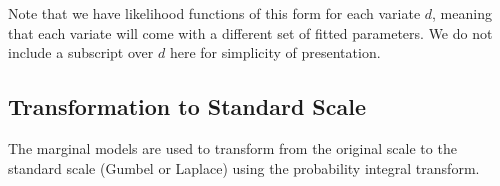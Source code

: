 Note that we have likelihood functions of this form for each variate $d$, meaning that each variate will come with a different set of fitted parameters. We do not include a subscript over $d$ here for simplicity of presentation.  

 







%
%

\subsection{Transformation to Standard Scale} \label{App2}
The marginal models are used to transform from the original scale to the standard scale (Gumbel or Laplace) using the probability integral transform. 


